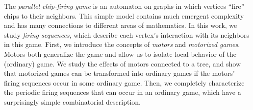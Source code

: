 The \emph{parallel chip-firing game} is an automaton on graphs in which
vertices ``fire'' chips to their neighbors. This simple model contains much
emergent complexity and has many connections to different areas of
mathematics. In this work, we study \emph{firing sequences}, which describe
each vertex's interaction with its neighbors in this game. First, we introduce
the concepts of \emph{motors} and \emph{motorized games}. Motors both
generalize the game and allow us to isolate local behavior of the (ordinary)
game. We study the effects of motors connected to a tree, and show that
motorized games can be transformed into ordinary games if the motors' firing
sequences occur in some ordinary game. Then, we completely characterize the
periodic firing sequences that can occur in an ordinary game, which have a
surprisingly simple combinatorial description.
